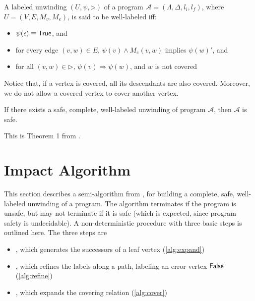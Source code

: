 \begin{defn}
  \label{defn:well-labeled-prog-unwinding}
  A labeled unwinding $(U, \psi, \rhd)$ of a program $\mathcal{A} = (\Lambda, \Delta, l_i, l_f)$, where $U = (V, E, M_v, M_e)$, is said to be well-labeled iff:

  \begin{itemize}
    \item $\psi(\epsilon) \equiv \mathsf{True}$, and
    \item for every edge $(v,w) \in E$, $\psi(v) \wedge M_e(v,w)$ implies $\psi(w)'$, and
    \item for all $(v,w) \in \rhd$, $\psi(v) \Rightarrow \psi(w)$, and $w$ is not covered
  \end{itemize}
\end{defn}

Notice that, if a vertex is covered, all its descendants are also covered. Moreover, we do
not allow a covered vertex to cover another vertex.

\begin{thm}
  If there exists a safe, complete, well-labeled unwinding of program $\mathcal{A}$, then $\mathcal{A}$ is safe.
\end{thm}

This is Theorem 1 from \cite{mcmillan06}.

\section{Impact Algorithm}
\label{sec:impact-algorithm}
%

This section describes a semi-algorithm from \cite{mcmillan06}, for building a complete,
safe, well-labeled unwinding of a program. The algorithm terminates if the program is
unsafe, but may not terminate if it is safe (which is expected, since program safety is
undecidable). A non-deterministic procedure with three basic steps is outlined here. The
three steps are

\begin{itemize}
  \item \expand, which generates the successors of a leaf vertex (\autoref{alg:expand})
  \item {}, which refines the labels along a path, labeling an error vertex $\mathsf{False}$ (\autoref{alg:refine})
  \item \cover, which expands the covering relation (\autoref{alg:cover})
\end{itemize}

